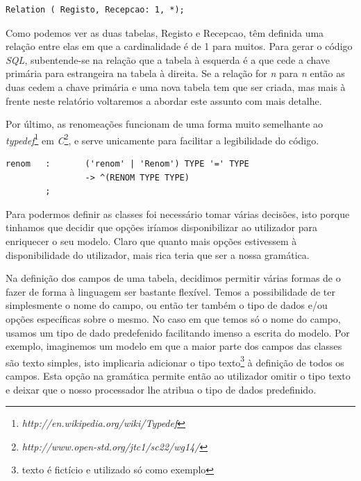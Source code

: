 \documentclass[a4paper]{article}
\begin{document}
\begin{small}
\begin{lstlisting}
Relation ( Registo, Recepcao: 1, *);
\end{lstlisting}
\end{small}

\hspace{1cm}Como podemos ver as duas tabelas, Registo e Recepcao, têm definida uma relação entre elas em que a cardinalidade é de 1 para muitos. Para gerar o código {\em SQL}, subentende-se na relação que a tabela à esquerda é a que cede a chave primária para estrangeira na tabela à direita. Se a relação for {\em n} para {\em n} então as duas cedem a chave primária e uma nova tabela tem que ser criada, mas mais à frente neste relatório voltaremos a abordar este assunto com mais detalhe.


\hspace{1cm}Por último, as renomeações funcionam de uma forma muito semelhante ao {\em typedef}\footnote{{\em http://en.wikipedia.org/wiki/Typedef}} em {\em C}\footnote{{\em http://www.open-std.org/jtc1/sc22/wg14/}}, e serve unicamente para facilitar a legibilidade do código.\\

\begin{small}
\begin{lstlisting}
renom   :       ('renom' | 'Renom') TYPE '=' TYPE
                -> ^(RENOM TYPE TYPE)
        ;
\end{lstlisting}
\end{small}

\hspace{1cm}Para podermos definir as classes foi necessário tomar várias decisões, isto porque tinhamos que decidir que opções iríamos disponibilizar ao utilizador para enriquecer o seu modelo. Claro que quanto mais opções estivessem à disponibilidade do utilizador, mais rica teria que ser a nossa gramática.

\hspace{1cm}Na definição dos campos de uma tabela, decidimos permitir várias formas de o fazer de forma à linguagem ser bastante flexível. Temos a possibilidade de ter simplesmente o nome do campo, ou então ter também o tipo de dados e/ou opções específicas sobre o mesmo. No caso em que temos só o nome do campo, usamos um tipo de dado predefenido facilitando imenso a escrita do modelo. Por exemplo, imaginemos um modelo em que a maior parte dos campos das classes são texto simples, isto implicaria adicionar o tipo texto\footnote{texto é fictício e utilizado só como exemplo} à definição de todos os campos. Esta opção na gramática permite então ao utilizador omitir o tipo texto e deixar que o nosso processador lhe atribua o tipo de dados predefinido.\\
\end{document}
